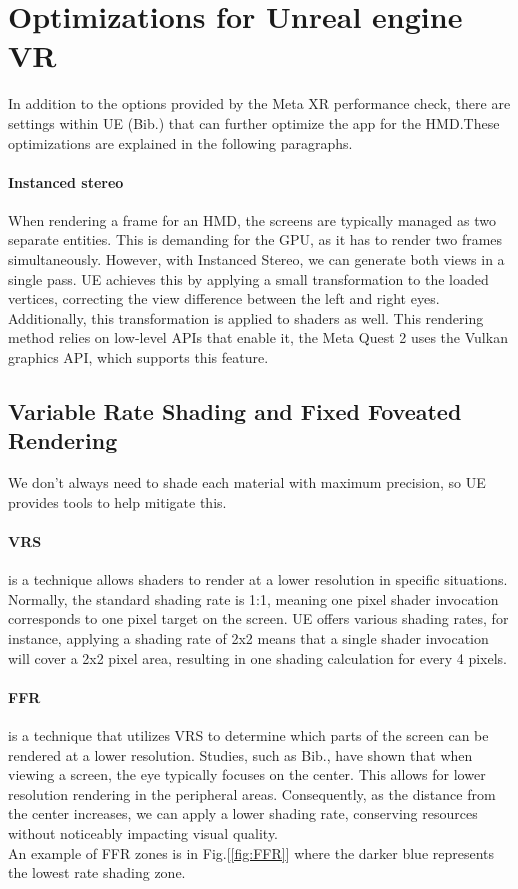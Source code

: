 \section{Optimizations for Unreal engine VR}
\noindent
In addition to the options provided by the Meta XR performance check, there are settings within \ac{UE} (Bib.\cite{UEperformance}) that can further optimize the app for the \ac{HMD}.These optimizations are explained in the following paragraphs.

\paragraph{Instanced stereo}
When rendering a frame for an \ac{HMD}, the screens are typically managed as two separate entities. This is demanding for the GPU, as it has to render two frames simultaneously.
However, with Instanced Stereo, we can generate both views in a single pass. \ac{UE} achieves this by applying a small transformation to the loaded vertices, correcting the view difference between the left and right eyes. Additionally, this transformation is applied to shaders as well.
This rendering method relies on low-level \ac{API}s that enable it, the Meta Quest 2 uses the Vulkan graphics \ac{API}, which supports this feature.

\subsection{Variable Rate Shading and Fixed Foveated Rendering}
\noindent
We don’t always need to shade each material with maximum precision, so \ac{UE} provides tools to help mitigate this.

\paragraph{\ac{VRS}}
is a technique allows shaders to render at a lower resolution in specific situations.
Normally, the standard shading rate is 1:1, meaning one pixel shader invocation corresponds to one pixel target on the screen.
\ac{UE} offers various shading rates, for instance, applying a shading rate of 2x2 means that a single shader invocation will cover a 2x2 pixel area, resulting in one shading calculation for every 4 pixels.

\paragraph{\ac{FFR}}
is a technique that utilizes \ac{VRS} to determine which parts of the screen can be rendered at a lower resolution.
Studies, such as Bib.\cite{eye}, have shown that when viewing a screen, the eye typically focuses on the center.
This allows for lower resolution rendering in the peripheral areas. Consequently, as the distance from the center increases, we can apply a lower shading rate, conserving resources without noticeably impacting visual quality.\\
An example of \ac{FFR} zones is in Fig.[\ref{fig:FFR}] where the darker blue represents the lowest rate shading zone.


